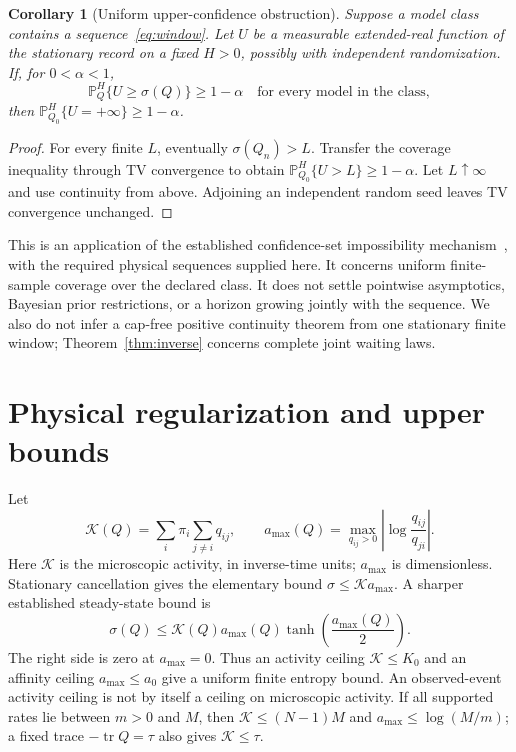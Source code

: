 \documentclass[aps,pre,onecolumn,11pt,longbibliography,notitlepage]{revtex4-2}
\newtheorem{corollary}[theorem]{Corollary}
\newcommand{\1}{\mathbf 1}
\newcommand{\tr}{\operatorname{tr}}
\newcommand{\sig}{\sigma}
\begin{document}
\begin{corollary}[Uniform upper-confidence obstruction]\label{cor:confidence}
Suppose a model class contains a sequence~\eqref{eq:window}. Let $U$ be a measurable extended-real function of the stationary record on a fixed $H>0$, possibly with independent randomization. If, for $0<\alpha<1$,
\begin{equation}
 \mathbb P_Q^H\{U\ge\sig(Q)\}\ge1-\alpha\quad\text{for every model in the class},
\end{equation}
then $\mathbb P_{Q_0}^H\{U=+\infty\}\ge1-\alpha$.
\end{corollary}
\begin{proof}
For every finite $L$, eventually $\sig(Q_n)>L$. Transfer the coverage inequality through TV convergence to obtain $\mathbb P_{Q_0}^H\{U>L\}\ge1-\alpha$. Let $L\uparrow\infty$ and use continuity from above. Adjoining an independent random seed leaves TV convergence unchanged.
\end{proof}
This is an application of the established confidence-set impossibility mechanism~\cite{Moss2022}, with the required physical sequences supplied here. It concerns uniform finite-sample coverage over the declared class. It does not settle pointwise asymptotics, Bayesian prior restrictions, or a horizon growing jointly with the sequence. We also do not infer a cap-free positive continuity theorem from one stationary finite window; Theorem~\ref{thm:inverse} concerns complete joint waiting laws.





\section{Physical regularization and upper bounds}\label{sec:regularization}
Let
\begin{equation}
 \mathcal K(Q)=\sum_i\pi_i\sum_{j\ne i}q_{ij},\qquad
 a_{\max}(Q)=\max_{q_{ij}>0}\left|\log\frac{q_{ij}}{q_{ji}}\right|.
\end{equation}
Here $\mathcal K$ is the microscopic activity, in inverse-time units;
$a_{\max}$ is dimensionless. Stationary cancellation gives the elementary
bound $\sig\le\mathcal K a_{\max}$. A sharper established steady-state
bound is~\cite{NishiyamaHasegawa2023}
\begin{equation}
 \sig(Q)\le\mathcal K(Q)a_{\max}(Q)
           \tanh\!\left(\frac{a_{\max}(Q)}2\right).\label{eq:sharpprior}
\end{equation}
The right side is zero at $a_{\max}=0$. Thus an activity ceiling
$\mathcal K\le K_0$ and an affinity ceiling $a_{\max}\le a_0$ give a
uniform finite entropy bound. An observed-event activity ceiling is not
by itself a ceiling on microscopic activity. If all supported rates lie
between $m>0$ and $M$, then
$\mathcal K\le(N-1)M$ and $a_{\max}\le\log(M/m)$; a fixed trace
$-\tr Q=\tau$ also gives $\mathcal K\le\tau$.
\end{document}
